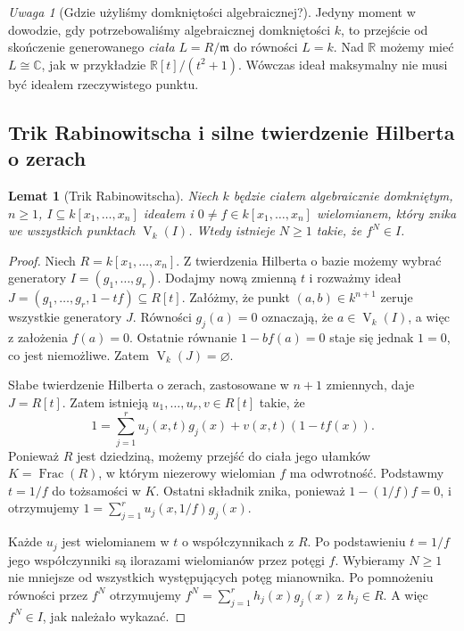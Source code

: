 \documentclass[11pt,a4paper,openany]{report}
\numberwithin{equation}{section}
\theoremstyle{plain}
\newtheorem{lemat}[twierdzenie]{Lemat}
\theoremstyle{definition}
\theoremstyle{remark}
\newtheorem{uwaga}[twierdzenie]{Uwaga}
\newcommand{\R}{\mathbb R}
\newcommand{\C}{\mathbb C}
\newcommand{\V}{\operatorname V}
\newcommand{\Frac}{\operatorname{Frac}}
\begin{document}
\begin{uwaga}[Gdzie użyliśmy domkniętości algebraicznej?]
Jedyny moment w dowodzie, gdy potrzebowaliśmy algebraicznej
domkniętości $k$, to przejście od skończenie generowanego
\emph{ciała} $L=R/\mathfrak m$ do równości $L=k$.
Nad $\R$ możemy mieć $L\cong\C$, jak w przykładzie
$\R[t]/(t^2+1)$. Wówczas ideał maksymalny nie musi być
ideałem rzeczywistego punktu.
\end{uwaga}

\subsection{Trik Rabinowitscha i silne twierdzenie Hilberta o zerach}

\begin{lemat}[Trik Rabinowitscha]
\label{lem:rabinowitsch}
Niech $k$ będzie ciałem algebraicznie domkniętym, $n\ge1$,
$I\subseteq k[x_1,\dots,x_n]$ ideałem i
$0\ne f\in k[x_1,\dots,x_n]$ wielomianem, który znika
we wszystkich punktach $\V_k(I)$.
Wtedy istnieje $N\ge1$ takie, że $f^N\in I$.
\end{lemat}
\begin{proof}
Niech $R=k[x_1,\dots,x_n]$.
Z twierdzenia Hilberta o bazie możemy wybrać generatory
$I=(g_1,\dots,g_r)$. Dodajmy nową zmienną $t$ i
rozważmy ideał
$J=(g_1,\dots,g_r,1-tf)\subseteq R[t]$.
Załóżmy, że punkt $(a,b)\in k^{n+1}$ zeruje wszystkie
generatory $J$. Równości $g_j(a)=0$ oznaczają,
że $a\in\V_k(I)$, a więc z założenia $f(a)=0$.
Ostatnie równanie $1-bf(a)=0$ staje się jednak $1=0$,
co jest niemożliwe. Zatem $\V_k(J)=\varnothing$.

Słabe twierdzenie Hilberta o zerach, zastosowane w $n+1$
zmiennych, daje $J=R[t]$.
Zatem istnieją $u_1,\dots,u_r,v\in R[t]$ takie, że
\[
1=\sum_{j=1}^r u_j(x,t)g_j(x)+v(x,t)(1-tf(x)).
\]
Ponieważ $R$ jest dziedziną, możemy przejść do ciała jego
ułamków $K=\Frac(R)$, w którym niezerowy wielomian $f$
ma odwrotność. Podstawmy $t=1/f$ do tożsamości w $K$.
Ostatni składnik znika, ponieważ $1-(1/f)f=0$, i otrzymujemy
$1=\sum_{j=1}^r u_j(x,1/f)g_j(x)$.

Każde $u_j$ jest wielomianem w $t$ o współczynnikach z $R$.
Po podstawieniu $t=1/f$ jego współczynniki są ilorazami
wielomianów przez potęgi $f$. Wybieramy $N\ge1$
nie mniejsze od wszystkich występujących potęg mianownika.
Po pomnożeniu równości przez $f^N$ otrzymujemy
$f^N=\sum_{j=1}^r h_j(x)g_j(x)$ z $h_j\in R$.
A więc $f^N\in I$, jak należało wykazać.
\end{proof}
\end{document}
